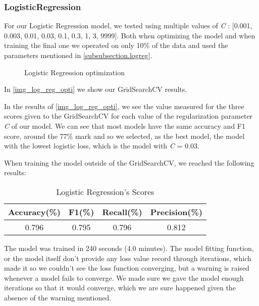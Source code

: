 \documentclass[12pt]{article}
\begin{document}
\subsubsection{LogisticRegression}
\label{subsubsection.logreg_tunning}
    \par 
        For our Logistic Regression model, we tested using multiple values of \textit{C} : [0.001, 0.003, 0.01, 0.03, 0.1, 0.3, 1, 3, 9999].
        Both when optimizing the model and when training the final one we operated on only 10\% of the data and used the parameters mentioned in \autoref{subsubsection.logreg}.
    \begin{figure}[!tb]
        \caption{Logistic Regression optimization}
        \label{img_log_reg_opti}
    \end{figure}
        In \autoref{img_log_reg_opti} we show our GridSearchCV results.
    \par 
        In the results of \autoref{img_log_reg_opti}, we see the value measured for the three scores given to the GridSearchCV for each value of 
        the regularization parameter \textit{C} of our model. We can see that most models have the same accuracy and F1 score, around the 77\% mark 
        and so we selected, as the best model, the model with the lowest logistic loss, which is the model with \textit{C} = 0.03.
    \par 
        When training the model outside of the GridSearchCV, we reached the following results:
    \begin{center}
        \begin{table}
            \caption{Logistic Regression's Scores}
            \begin{center}
            \begin{tabular}{|c |c |c |c|}
                \hline
                Accuracy(\%) & F1(\%) & Recall(\%) & Precision(\%) \\ [0.5ex] 
                \hline
                0.796 & 0.795 & 0.796 & 0.812 \\ 
                \hline
            \end{tabular}
            \label{tab_log_reg}
        \end{center}
        \end{table}
    \end{center}
    \par 
        The model was trained in 240 seconds (4.0 minutes).
        The model fitting function, or the model itself don't provide any loss value record through iterations, which made it so we couldn't see the 
        loss function converging, but a warning is raised whenever a model fails to converge. We made sure we gave the model enough iterations so that 
        it would converge, which we are sure happened given the absence of the warning mentioned.
\end{document}
